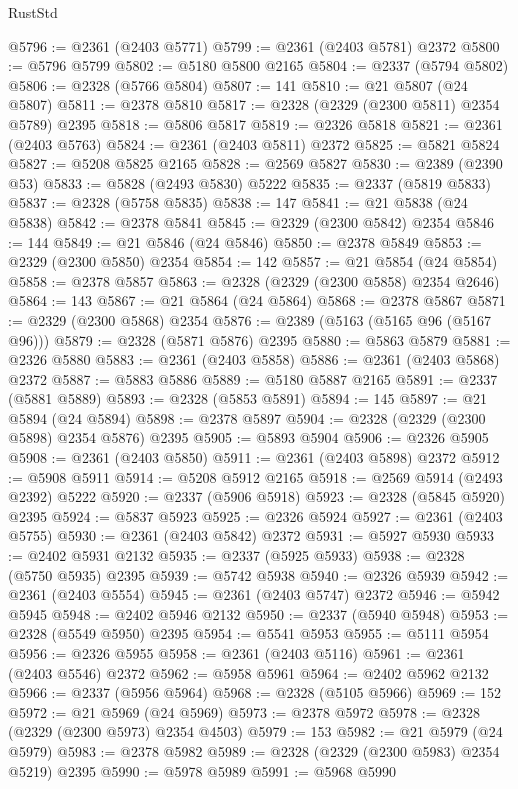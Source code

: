 \begin{lexlean}{RustStd}
\begin{coremodule}
{\begin{coremodule}
{{{{{{{{{{{{{{{{{{{{{{{{{{{{{{{{{{{{{@5796 := @2361 (@2403 @5771)
@5799 := @2361 (@2403 @5781) @2372
@5800 := @5796 @5799
@5802 := @5180 @5800 @2165
@5804 := @2337 (@5794 @5802)
@5806 := @2328 (@5766 @5804)
@5807 := 141
@5810 := @21 @5807 (@24 @5807)
@5811 := @2378 @5810
@5817 := @2328 (@2329 (@2300 @5811) @2354 @5789) @2395
@5818 := @5806 @5817
@5819 := @2326 @5818
@5821 := @2361 (@2403 @5763)
@5824 := @2361 (@2403 @5811) @2372
@5825 := @5821 @5824
@5827 := @5208 @5825 @2165
@5828 := @2569 @5827
@5830 := @2389 (@2390 @53)
@5833 := @5828 (@2493 @5830) @5222
@5835 := @2337 (@5819 @5833)
@5837 := @2328 (@5758 @5835)
@5838 := 147
@5841 := @21 @5838 (@24 @5838)
@5842 := @2378 @5841
@5845 := @2329 (@2300 @5842) @2354
@5846 := 144
@5849 := @21 @5846 (@24 @5846)
@5850 := @2378 @5849
@5853 := @2329 (@2300 @5850) @2354
@5854 := 142
@5857 := @21 @5854 (@24 @5854)
@5858 := @2378 @5857
@5863 := @2328 (@2329 (@2300 @5858) @2354 @2646)
@5864 := 143
@5867 := @21 @5864 (@24 @5864)
@5868 := @2378 @5867
@5871 := @2329 (@2300 @5868) @2354
@5876 := @2389 (@5163 (@5165 @96 (@5167 @96)))
@5879 := @2328 (@5871 @5876) @2395
@5880 := @5863 @5879
@5881 := @2326 @5880
@5883 := @2361 (@2403 @5858)
@5886 := @2361 (@2403 @5868) @2372
@5887 := @5883 @5886
@5889 := @5180 @5887 @2165
@5891 := @2337 (@5881 @5889)
@5893 := @2328 (@5853 @5891)
@5894 := 145
@5897 := @21 @5894 (@24 @5894)
@5898 := @2378 @5897
@5904 := @2328 (@2329 (@2300 @5898) @2354 @5876) @2395
@5905 := @5893 @5904
@5906 := @2326 @5905
@5908 := @2361 (@2403 @5850)
@5911 := @2361 (@2403 @5898) @2372
@5912 := @5908 @5911
@5914 := @5208 @5912 @2165
@5918 := @2569 @5914 (@2493 @2392) @5222
@5920 := @2337 (@5906 @5918)
@5923 := @2328 (@5845 @5920) @2395
@5924 := @5837 @5923
@5925 := @2326 @5924
@5927 := @2361 (@2403 @5755)
@5930 := @2361 (@2403 @5842) @2372
@5931 := @5927 @5930
@5933 := @2402 @5931 @2132
@5935 := @2337 (@5925 @5933)
@5938 := @2328 (@5750 @5935) @2395
@5939 := @5742 @5938
@5940 := @2326 @5939
@5942 := @2361 (@2403 @5554)
@5945 := @2361 (@2403 @5747) @2372
@5946 := @5942 @5945
@5948 := @2402 @5946 @2132
@5950 := @2337 (@5940 @5948)
@5953 := @2328 (@5549 @5950) @2395
@5954 := @5541 @5953
@5955 := @5111 @5954
@5956 := @2326 @5955
@5958 := @2361 (@2403 @5116)
@5961 := @2361 (@2403 @5546) @2372
@5962 := @5958 @5961
@5964 := @2402 @5962 @2132
@5966 := @2337 (@5956 @5964)
@5968 := @2328 (@5105 @5966)
@5969 := 152
@5972 := @21 @5969 (@24 @5969)
@5973 := @2378 @5972
@5978 := @2328 (@2329 (@2300 @5973) @2354 @4503)
@5979 := 153
@5982 := @21 @5979 (@24 @5979)
@5983 := @2378 @5982
@5989 := @2328 (@2329 (@2300 @5983) @2354 @5219) @2395
@5990 := @5978 @5989
@5991 := @5968 @5990
}}}}}}}}}}}}}}}}}}}}}}}}}}}}}}}}}}}}}
\end{coremodule}}
\end{coremodule}
\end{lexlean}
